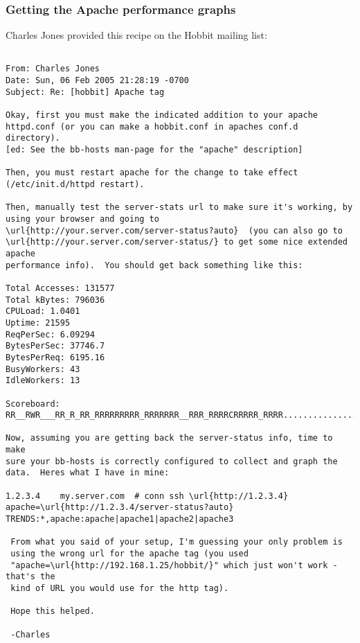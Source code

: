 \subsubsection{Getting the Apache performance graphs}


 Charles Jones provided this recipe on the Hobbit mailing list:
\begin{verbatim}

From: Charles Jones
Date: Sun, 06 Feb 2005 21:28:19 -0700
Subject: Re: [hobbit] Apache tag

Okay, first you must make the indicated addition to your apache
httpd.conf (or you can make a hobbit.conf in apaches conf.d directory).
[ed: See the bb-hosts man-page for the "apache" description]

Then, you must restart apache for the change to take effect
(/etc/init.d/httpd restart).

Then, manually test the server-stats url to make sure it's working, by
using your browser and going to
\url{http://your.server.com/server-status?auto}  (you can also go to
\url{http://your.server.com/server-status/} to get some nice extended apache
performance info).  You should get back something like this:

Total Accesses: 131577
Total kBytes: 796036
CPULoad: 1.0401
Uptime: 21595
ReqPerSec: 6.09294
BytesPerSec: 37746.7
BytesPerReq: 6195.16
BusyWorkers: 43
IdleWorkers: 13

Scoreboard: RR__RWR___RR_R_RR_RRRRRRRRR_RRRRRRR__RRR_RRRRCRRRRR_RRRR........................................................................................................................................................................................................

Now, assuming you are getting back the server-status info, time to make
sure your bb-hosts is correctly configured to collect and graph the
data.  Heres what I have in mine:

1.2.3.4    my.server.com  # conn ssh \url{http://1.2.3.4} apache=\url{http://1.2.3.4/server-status?auto} TRENDS:*,apache:apache|apache1|apache2|apache3

 From what you said of your setup, I'm guessing your only problem is
 using the wrong url for the apache tag (you used
 "apache=\url{http://192.168.1.25/hobbit/}" which just won't work - that's the
 kind of URL you would use for the http tag).

 Hope this helped.

 -Charles

\end{verbatim}
 
